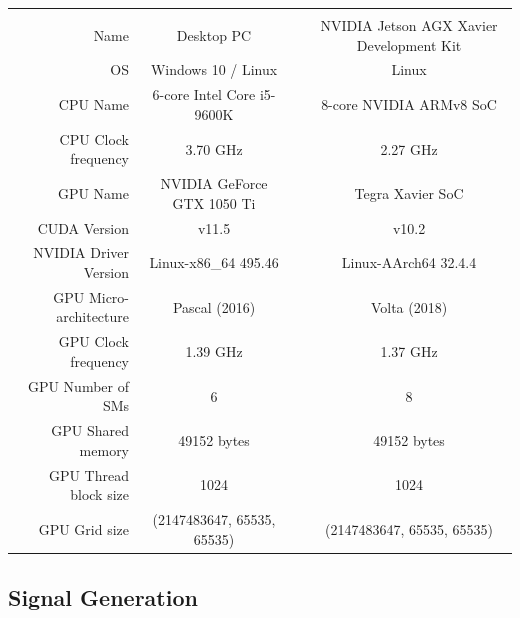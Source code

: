 \documentclass{juliacon}
\begin{document}
\begin{table}[t]
{\begin{tabular}{rclc}
        \multicolumn{1}{l}{}   & \multicolumn{1}{l}{}       &                      & \multicolumn{1}{l}{}                      \\
        Name                   & Desktop PC                 &                      & NVIDIA Jetson AGX Xavier Development Kit  \\
        OS                     & Windows 10 / Linux         &                      & Linux                                     \\
        CPU Name               & 6-core Intel Core i5-9600K &                      & 8-core NVIDIA ARMv8 SoC                   \\
        CPU Clock frequency    & 3.70 GHz                   &                      & 2.27 GHz                                  \\
        GPU Name               & NVIDIA GeForce GTX 1050 Ti &                      & Tegra Xavier SoC                          \\
        CUDA Version& v11.5       &                      & v10.2                     \\
        NVIDIA Driver Version & Linux-x86\_64 495.46              &                      & Linux-AArch64 32.4.4                             \\
        GPU Micro-architecture & Pascal (2016)              &                      & Volta (2018)                              \\
        GPU Clock frequency    & 1.39 GHz                   &                      & 1.37 GHz                                  \\
        GPU Number of SMs      & 6                          &                      & 8                                         \\
        GPU Shared memory      & 49152 bytes                &                      & 49152 bytes                               \\
        GPU Thread block size  & 1024                       &                      & 1024                                      \\
        GPU Grid size          & (2147483647, 65535, 65535) &                      & (2147483647, 65535, 65535)               
    \end{tabular}}
    
\end{table}

\subsection*{Signal Generation}
\end{document}
